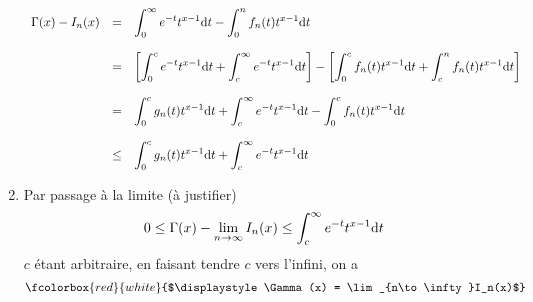 \documentclass{article}
\def \de {{\rm d}}
\newcommand{\myredbox}[1]{\fcolorbox{red}{white}{$\displaystyle#1$}}
\begin{document}
\begin{enumerate}
\[\begin{array}{rcl}
\Gamma(x) - I_n(x)&=&\displaystyle \int_0^\infty e^{-t}t^{x-1}\de t -\int_0^n f_n(t)t^{x-1}\de t\\  \\
&=&\displaystyle \left[ \int_0^c e^{-t}t^{x-1}\de t + \int_c^\infty e^{-t}t^{x-1}\de t\right] -\left[ \int_0^c f_n(t)t^{x-1}\de t +\int_c^n f_n(t)t^{x-1}\de t\right] \\  \\
&=&\displaystyle \int_0^c g_n(t)t^{x-1}\de t + \int_c^\infty e^{-t}t^{x-1}\de t -\int_0^c f_n(t)t^{x-1}\de t \\  \\
&\leq &\displaystyle \int_0^c g_n(t)t^{x-1}\de t + \int_c^\infty e^{-t}t^{x-1}\de t 
\end{array} \]

\item Par passage à la limite (à justifier)
\[0\leq \Gamma(x) - \lim_{n\to\infty}I_n(x)\leq \int_c^\infty e^{-t}t^{x-1}\de t \]
$c$ étant arbitraire, en faisant tendre $c$ vers l'infini, on a 
\[\myredbox{\Gamma(x) = \lim_{n\to\infty}I_n(x)}\]
\end{enumerate}
\end{document}
